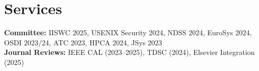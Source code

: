 \documentclass[letterpaper,11pt]{article}
\newcommand{\resumeSubHeadingListStart}{\begin{itemize}[leftmargin=0.15in, label={}]}
\newcommand{\resumeSubHeadingListEnd}{\end{itemize}}
\begin{document}
\section{Services}
  \vspace{2pt}
  \resumeSubHeadingListStart
    \small{\item{
        \textbf{Committee:} IISWC 2025, USENIX Security 2024, NDSS 2024, EuroSys 2024, OSDI 2023/24, ATC 2023, HPCA 2024, JSys 2023
        \\ \vspace{3pt}
        \textbf{Journal Reviews:} IEEE CAL (2023–2025), TDSC (2024), Elsevier Integration (2025) \hfill 
    }}
  \resumeSubHeadingListEnd

  
\end{document}
